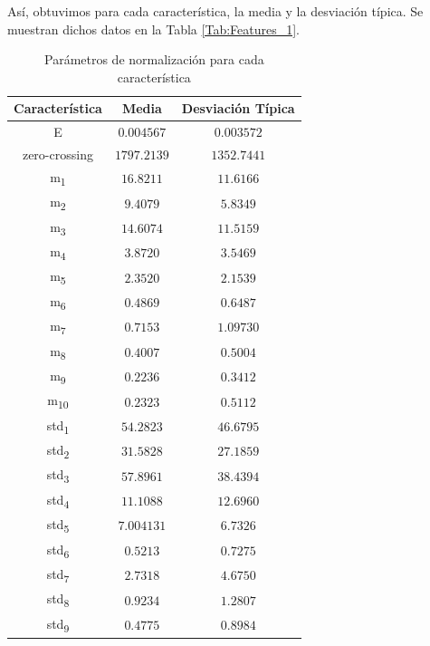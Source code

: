 \documentclass[12pt]{article}
\begin{document}
Así, obtuvimos para cada característica, la media y la desviación típica. Se muestran dichos datos en la Tabla \ref{Tab:Features_1}.

\newpage

\begin{table}[!ht]
	\caption{Parámetros de normalización para cada característica}
	\centering
		\begin{tabular}{||c c c||}
			\hline
			Característica & Media & Desviación Típica  \\ [0.5ex]
			\hline\hline
			E & $0.004567$ & $0.003572$ \\
			\hline
			zero-crossing & $1797.2139$ & $1352.7441$ \\
			\hline
			m\textsubscript{1} & $16.8211$ & $11.6166$ \\
			\hline
			m\textsubscript{2} & $9.4079$ & $5.8349$ \\
			\hline
			m\textsubscript{3} & $14.6074$ & $11.5159$ \\
			\hline
			m\textsubscript{4} & $3.8720$ & $3.5469$ \\
			\hline
			m\textsubscript{5} & $2.3520$ & $2.1539$ \\
			\hline
			m\textsubscript{6} & $0.4869$ & $0.6487$ \\
			\hline
			m\textsubscript{7} & $0.7153$ & $1.09730$ \\
			\hline
			m\textsubscript{8} & $0.4007$ & $0.5004$ \\
			\hline
			m\textsubscript{9} & $0.2236$ & $0.3412$ \\
			\hline
			m\textsubscript{10} & $0.2323$ & $0.5112$ \\
			\hline
			std\textsubscript{1} & $54.2823$ & $46.6795$ \\
			\hline
			std\textsubscript{2} & $31.5828$ & $27.1859$ \\
			\hline
			std\textsubscript{3} & $57.8961$ & $38.4394$ \\
			\hline
			std\textsubscript{4} & $11.1088$ & $12.6960$ \\
			\hline
			std\textsubscript{5} & $7.004131$ & $6.7326$ \\
			\hline
			std\textsubscript{6} & $0.5213$ & $0.7275$ \\
			\hline
			std\textsubscript{7} & $2.7318$ & $4.6750$ \\
			\hline
			std\textsubscript{8} & $0.9234$ & $1.2807$ \\
			\hline
			std\textsubscript{9} & $0.4775$ & $0.8984$ \\

\end{tabular}
\end{table}
\end{document}

